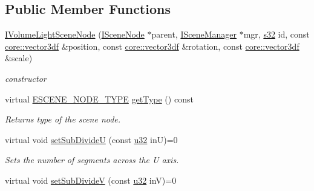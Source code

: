 \subsection*{Public Member Functions}
\begin{DoxyCompactItemize}
\item 
\hyperlink{classirr_1_1scene_1_1IVolumeLightSceneNode_a4bbb5ce233b9f8807ca62cbc0d48e5a9}{I\+Volume\+Light\+Scene\+Node} (\hyperlink{classirr_1_1scene_1_1ISceneNode}{I\+Scene\+Node} $\ast$parent, \hyperlink{classirr_1_1scene_1_1ISceneManager}{I\+Scene\+Manager} $\ast$mgr, \hyperlink{namespaceirr_ac66849b7a6ed16e30ebede579f9b47c6}{s32} id, const \hyperlink{namespaceirr_1_1core_a06f169d08b5c429f5575acb7edbad811}{core\+::vector3df} \&position, const \hyperlink{namespaceirr_1_1core_a06f169d08b5c429f5575acb7edbad811}{core\+::vector3df} \&rotation, const \hyperlink{namespaceirr_1_1core_a06f169d08b5c429f5575acb7edbad811}{core\+::vector3df} \&scale)\hypertarget{classirr_1_1scene_1_1IVolumeLightSceneNode_a4bbb5ce233b9f8807ca62cbc0d48e5a9}{}\label{classirr_1_1scene_1_1IVolumeLightSceneNode_a4bbb5ce233b9f8807ca62cbc0d48e5a9}

\begin{DoxyCompactList}\small\item\em constructor \end{DoxyCompactList}\item 
virtual \hyperlink{namespaceirr_1_1scene_acad3d7ef92a9807d391ba29120f3b7bd}{E\+S\+C\+E\+N\+E\+\_\+\+N\+O\+D\+E\+\_\+\+T\+Y\+PE} \hyperlink{classirr_1_1scene_1_1IVolumeLightSceneNode_aaeb00bc1d00bdef60d1c3619e4b78325}{get\+Type} () const \hypertarget{classirr_1_1scene_1_1IVolumeLightSceneNode_aaeb00bc1d00bdef60d1c3619e4b78325}{}\label{classirr_1_1scene_1_1IVolumeLightSceneNode_aaeb00bc1d00bdef60d1c3619e4b78325}

\begin{DoxyCompactList}\small\item\em Returns type of the scene node. \end{DoxyCompactList}\item 
virtual void \hyperlink{classirr_1_1scene_1_1IVolumeLightSceneNode_a38d9dfc64c70660882c3bed4bfb65aea}{set\+Sub\+DivideU} (const \hyperlink{namespaceirr_a0416a53257075833e7002efd0a18e804}{u32} inU)=0\hypertarget{classirr_1_1scene_1_1IVolumeLightSceneNode_a38d9dfc64c70660882c3bed4bfb65aea}{}\label{classirr_1_1scene_1_1IVolumeLightSceneNode_a38d9dfc64c70660882c3bed4bfb65aea}

\begin{DoxyCompactList}\small\item\em Sets the number of segments across the U axis. \end{DoxyCompactList}\item 
virtual void \hyperlink{classirr_1_1scene_1_1IVolumeLightSceneNode_a768059900d05389fd7cd832290d085fc}{set\+Sub\+DivideV} (const \hyperlink{namespaceirr_a0416a53257075833e7002efd0a18e804}{u32} inV)=0\hypertarget{classirr_1_1scene_1_1IVolumeLightSceneNode_a768059900d05389fd7cd832290d085fc}{}\label{classirr_1_1scene_1_1IVolumeLightSceneNode_a768059900d05389fd7cd832290d085fc}


\end{DoxyCompactItemize}
